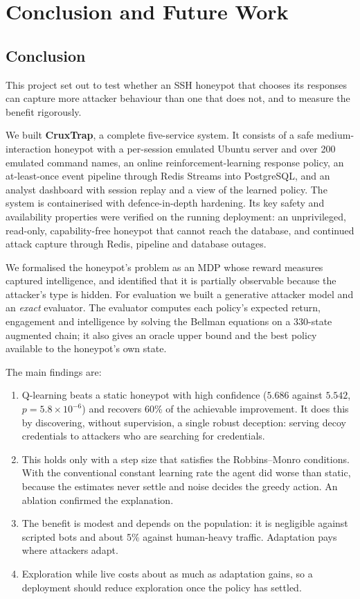 \chapter{Conclusion and Future Work}
\label{ch:conclusion}

\section{Conclusion}

This project set out to test whether an SSH honeypot that chooses its responses can capture more
attacker behaviour than one that does not, and to measure the benefit rigorously.

We built \textbf{CruxTrap}, a complete five-service system. It consists of a safe
medium-interaction honeypot with a per-session emulated Ubuntu server and over 200 emulated
command names, an online reinforcement-learning response policy, an at-least-once event pipeline
through Redis Streams into PostgreSQL, and an analyst dashboard with session replay and a view of
the learned policy. The system is containerised with defence-in-depth hardening. Its key safety
and availability properties were verified on the running deployment: an unprivileged, read-only,
capability-free honeypot that cannot reach the database, and continued attack capture through
Redis, pipeline and database outages.

We formalised the honeypot's problem as an MDP whose reward measures captured intelligence, and
identified that it is partially observable because the attacker's type is hidden. For evaluation
we built a generative attacker model and an \emph{exact} evaluator. The evaluator computes each
policy's expected return, engagement and intelligence by solving the Bellman equations on a
330-state augmented chain; it also gives an oracle upper bound and the best policy available to
the honeypot's own state.

The main findings are:
\begin{enumerate}
  \item Q-learning beats a static honeypot with high confidence ($5.686$ against $5.542$,
    $p = 5.8 \times 10^{-6}$) and recovers 60\% of the achievable improvement. It does this by
    discovering, without supervision, a single robust deception: serving decoy credentials to
    attackers who are searching for credentials.
  \item This holds only with a step size that satisfies the Robbins--Monro conditions. With the
    conventional constant learning rate the agent did worse than static, because the estimates
    never settle and noise decides the greedy action. An ablation confirmed the explanation.
  \item The benefit is modest and depends on the population: it is negligible against scripted
    bots and about 5\% against human-heavy traffic. Adaptation pays where attackers adapt.
  \item Exploration while live costs about as much as adaptation gains, so a deployment should
    reduce exploration once the policy has settled.
\end{enumerate}

